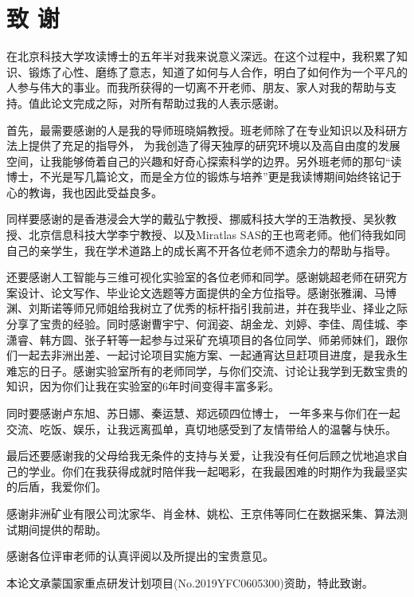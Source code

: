 
\chapter*{\centering  致 \space 谢}
在北京科技大学攻读博士的五年半对我来说意义深远。在这个过程中，我积累了知识、锻炼了心性、磨练了意志，知道了如何与人合作，明白了如何作为一个平凡的人参与伟大的事业。而我所获得的一切离不开老师、朋友、家人对我的帮助与支持。值此论文完成之际，对所有帮助过我的人表示感谢。

首先，最需要感谢的人是我的导师班晓娟教授。班老师除了在专业知识以及科研方法上提供了充足的指导外，
为我创造了得天独厚的研究环境以及高自由度的发展空间，让我能够倚着自己的兴趣和好奇心探索科学的边界。另外班老师的那句“读博士，不光是写几篇论文，而是全方位的锻炼与培养”更是我读博期间始终铭记于心的教诲，我也因此受益良多。

同样要感谢的是香港浸会大学的戴弘宁教授、挪威科技大学的王浩教授、吴狄教授、北京信息科技大学李宁教授、以及Miratlas SAS的王也弯老师。他们待我如同自己的亲学生，我在学术道路上的成长离不开各位老师不遗余力的帮助与指导。

还要感谢人工智能与三维可视化实验室的各位老师和同学。感谢姚超老师在研究方案设计、论文写作、毕业论文选题等方面提供的全方位指导。感谢张雅澜、马博渊、刘斯诺等师兄师姐给我树立了优秀的标杆指引我前进，并在我毕业、择业之际分享了宝贵的经验。同时感谢曹宇宁、何润姿、胡金龙、刘婷、李佳、周佳城、李潇睿、韩方圆、张子轩等一起参与过采矿充填项目的各位同学、师弟师妹们，跟你们一起去非洲出差、一起讨论项目实施方案、一起通宵达旦赶项目进度，是我永生难忘的日子。感谢实验室所有的老师同学，与你们交流、讨论让我学到无数宝贵的知识，因为你们让我在实验室的6年时间变得丰富多彩。

同时要感谢卢东旭、苏日娜、秦运慧、郑远硕四位博士，
一年多来与你们在一起交流、吃饭、娱乐，让我远离孤单，真切地感受到了友情带给人的温馨与快乐。

最后还要感谢我的父母给我无条件的支持与关爱，让我没有任何后顾之忧地追求自己的学业。你们在我获得成就时陪伴我一起喝彩，在我最困难的时期作为我最坚实的后盾，我爱你们。

感谢非洲矿业有限公司沈家华、肖金林、姚松、王京伟等同仁在数据采集、算法测试期间提供的帮助。

感谢各位评审老师的认真评阅以及所提出的宝贵意见。

本论文承蒙国家重点研发计划项目(No.2019YFC0605300)资助，特此致谢。



